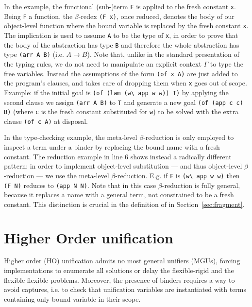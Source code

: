 \documentclass{llncs}
\begin{document}
In the example, the functional (sub-)term
\verb+F+ is applied to the fresh constant \verb+x+. Being \verb+F+ a
function, the $\beta$-redex \verb+(F x)+, once reduced, denotes the body of
our object-level function where the bound variable is replaced by the fresh
constant \verb+x+.
The implication is used to
assume \verb+A+ to be the type of \verb+x+, in order to prove that the body of
the abstraction has type \verb+B+ and therefore the whole abstraction has type
\verb+(arr A B)+ (i.e. $A \to B$). Note that, unlike in
the standard presentation of the typing rules, we do not need to manipulate an
explicit context $\Gamma$ to type the free variables. Instead the assumptions
of the form \verb+(of x A)+ are just added to the program's clauses, and \lp{}
takes care of dropping them when \verb+x+ goes out of scope.
Example: if the initial goal is
\verb+(of (lam (w\ app w w)) T)+ by applying the second clause we assign
\verb+(arr A B)+ to \verb+T+ and generate
a new goal \verb+(of (app c c) B)+ (where \verb+c+ is the fresh constant
substituted for \verb+w+) to be solved with the extra clause \verb+(of c A)+
at disposal.

In the type-checking example, the meta-level $\beta$-reduction is only employed
to inspect a term under a binder by replacing the bound name with a fresh
constant. The reduction example in line 6
shows instead a radically different pattern: in order to implement object-level
substitution --- and thus object-level $\beta$-reduction --- we use the
meta-level $\beta$-reduction. E.g. if \verb+F+ is \verb+(w\ app w w)+
then \verb+(F N)+ reduces to \verb+(app N N)+. Note that in this case
$\beta$-reduction is fully general, because it replaces a name with a
general term, not constrained to be a fresh constant.
This distinction is crucial in the definition of \rff{} in
Section~\ref{sec:fragment}.

\section{Higher Order unification}%
\label{sec:ho}
Higher order (HO) unification admits no most general unifiers (MGUs), forcing
implementations to enumerate all solutions or delay the flexible-rigid
and the flexible-flexible problems. Moreover, the presence of binders
requires a way to avoid captures, i.e. to check that unification variables
are instantiated with terms containing only bound variable in their scope.
\end{document}
